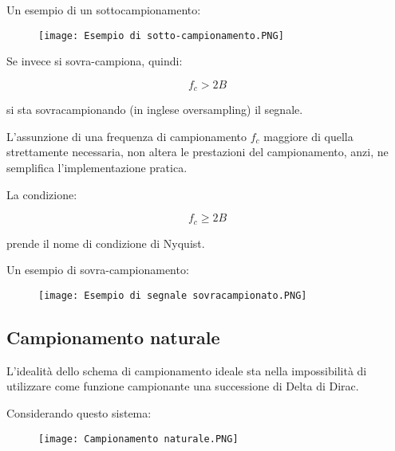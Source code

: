 Un esempio di un sottocampionamento: 

\begin{figure}[h]
    \centering
    \texttt{[image: Esempio di sotto-campionamento.PNG]}
\end{figure}  

\newpage 

Se invece si sovra-campiona, quindi: 

{
    \Large 
    \begin{equation}
        f_c > 2B
    \end{equation}
}

si sta sovracampionando (in inglese oversampling) il segnale. \newline 

L'assunzione di una frequenza di campionamento $f_c$ maggiore di quella strettamente necessaria, 
non altera le prestazioni del campionamento, anzi, ne semplifica l'implementazione pratica. \newline 

La condizione: 

{
    \Large 
    \begin{equation}
        f_c \geq 2B
    \end{equation}
} 

prende il nome di condizione di Nyquist. \newline 

Un esempio di sovra-campionamento: 

\begin{figure}[h]
    \centering
    \texttt{[image: Esempio di segnale sovracampionato.PNG]}
\end{figure}  

\newpage 

\subsection{Campionamento naturale} 

L'idealità dello schema di campionamento ideale sta nella impossibilità di utilizzare 
come funzione campionante una successione di Delta di Dirac. \newline 

Considerando questo sistema: 

\begin{figure}[h]
    \centering
    \texttt{[image: Campionamento naturale.PNG]}
\end{figure}  

